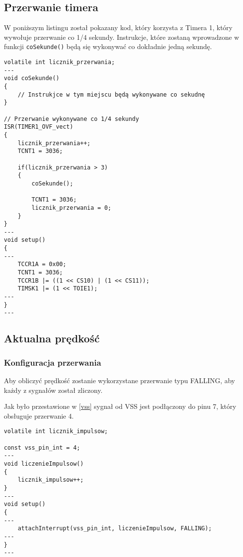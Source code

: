 \subsection{Przerwanie timera} \label{setting_timer_interupt}

W poniższym listingu został pokazany kod, który korzysta z Timera 1, który wywołuje przerwanie co 1/4 sekundy. Instrukcje, które zostaną wprowadzone w funkcji \texttt{coSekunde()} będą się wykonywać co dokładnie jedną sekundę.

\begin{lstlisting}[label=list:timer_int,caption=Ustawianie przerwania timera,
basicstyle=\footnotesize\ttfamily]
volatile int licznik_przerwania;
---
void coSekunde()
{
    // Instrukjce w tym miejscu będą wykonywane co sekudnę
}

// Przerwanie wykonywane co 1/4 sekundy
ISR(TIMER1_OVF_vect)
{
    licznik_przerwania++;
    TCNT1 = 3036;
    
    if(licznik_przerwania > 3) 
    {
        coSekunde();

        TCNT1 = 3036;
        licznik_przerwania = 0;
    }
}
---
void setup()
{
---
    TCCR1A = 0x00;
    TCNT1 = 3036;
    TCCR1B |= ((1 << CS10) | (1 << CS11));
    TIMSK1 |= (1 << TOIE1);
---
}
---
\end{lstlisting}



\subsection{Aktualna prędkość}
\subsubsection{Konfiguracja przerwania}

Aby obliczyć prędkość zostanie wykorzystane przerwanie typu FALLING, aby każdy z sygnałów został zliczony.

Jak było przestawione w \ref{vss} sygnał od VSS jest podłączony do pinu 7, który obsługuje przerwanie 4.

\begin{lstlisting}[label=list:vss_int,caption=Ustawianie przerwania VSS,
basicstyle=\footnotesize\ttfamily]
volatile int licznik_impulsow;

const vss_pin_int = 4;
---
void liczenieImpulsow()
{
    licznik_impulsow++;
}
---
void setup()
{
---
    attachInterrupt(vss_pin_int, liczenieImpulsow, FALLING);
---
}
---
\end{lstlisting}
